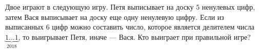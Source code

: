 Двое играют в следующую игру. Петя выписывает на доску $5$ ненулевых цифр, затем Вася выписывает на доску еще одну ненулевую цифру. Если из выписанных $6$ цифр можно составить число, которое является делителем числа $\underset{2018}{\underbrace{1\ldots1}}$, то выигрывает Петя, иначе --- Вася. Кто выиграет при правильной игре?